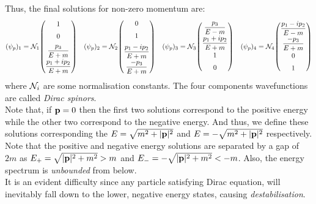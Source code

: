 Thus, the final solutions for non-zero momentum are:
\[
(\psi_p)_1 =
\SN_1 \mqty(
  1 \\[6pt]
  0 \\[6pt]
  \dfrac{p_3}{E+m} \\[6pt]
  \dfrac{p_1 + i p_2}{E+m}
)
\quad
(\psi_p)_2 =
\SN_2 \mqty(
  0 \\[6pt]
  1 \\[6pt]
  \dfrac{p_1 - i p_2}{E+m} \\[6pt]
  \dfrac{-p_3}{E+m}
)
\quad
(\psi_p)_3 =
\SN_3 \mqty(
  \dfrac{p_3}{E-m} \\[6pt]
  \dfrac{p_1 + i p_2}{E+m} \\[6pt]
  1 \\[6pt]
  0
)
\quad
(\psi_p)_4 =
\SN_4 \mqty(
  \dfrac{p_1 - i p_2}{E-m} \\[6pt]
  \dfrac{-p_3}{E+m} \\[6pt]
  0 \\[6pt]
  1
)
\]
where $\mathcal N_i$ are some normalisation constants. The four components wavefunctions are called \textit{Dirac spinors}.\\[0.25cm]%
Note that, if $\vb{p}=0$ then the first two solutions correspond to the positive energy while the other two correspond to the negative energy. And thus, we define these solutions corresponding the $E=\sqrt{m^2+|\vb{p}|^2}$ and $E=-\sqrt{m^2+|\vb{p}|^2}$ respectively. \\[0.2cm]
Note that the positive and negative energy solutions are separated by a gap of $2m$ as $E_+ = \sqrt{|\vb{p}|^2 + m^2}> m $ and $E_- =-\sqrt{|\vb{p}|^2 + m^2}< -m$. Also, the energy spectrum is \textit{unbounded} from below. \\[0.2cm]
It is an evident difficulty since any particle satisfying Dirac equation, will inevitably fall down to the lower, negative energy states, causing \textit{destabilisation}. 
